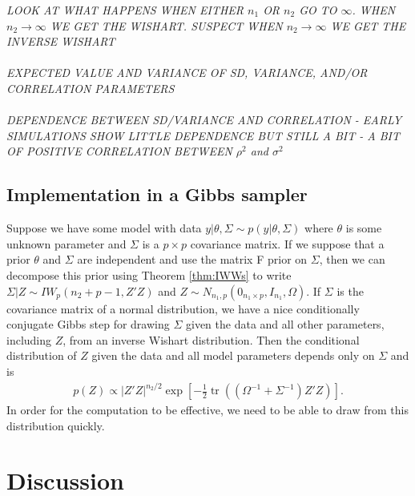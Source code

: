 \documentclass{article}\usepackage[]{graphicx}\usepackage[]{color}
\DeclareMathOperator{\tr}{tr}
\begin{document}
{\it LOOK AT WHAT HAPPENS WHEN EITHER $n_1$ OR $n_2$ GO TO $\infty$. WHEN $n_2\to\infty$ WE GET THE WISHART. SUSPECT WHEN $n_2\to\infty$ WE GET THE INVERSE WISHART}\\~\\

{\it EXPECTED VALUE AND VARIANCE OF 
  SD, VARIANCE, AND/OR CORRELATION PARAMETERS}\\~\\


{\it DEPENDENCE BETWEEN SD/VARIANCE AND CORRELATION - EARLY SIMULATIONS SHOW LITTLE DEPENDENCE BUT STILL A BIT - A BIT OF POSITIVE CORRELATION BETWEEN $\rho^2$ and $\sigma^2$}

\subsection{Implementation in a Gibbs sampler}

Suppose we have some model with data $y|\theta,\Sigma\sim p(y|\theta,\Sigma)$ where $\theta$ is some unknown parameter and $\Sigma$ is a $p\times p$ covariance matrix. If we suppose that a prior $\theta$ and $\Sigma$ are independent and use the matrix F prior on $\Sigma$, then we can decompose this prior using Theorem \eqref{thm:IWWs} to write $\Sigma|Z \sim IW_p(n_2 + p - 1, Z'Z)$ and $Z\sim N_{n_1,p}(0_{n_1\times p},I_{n_1},\Omega)$. If $\Sigma$ is the covariance matrix of a normal distribution, we have a nice conditionally conjugate Gibbs step for drawing $\Sigma$ given the data and all other parameters, including $Z$, from an inverse Wishart distribution. Then the conditional distribution of $Z$ given the data and all model parameters depends only on $\Sigma$ and is
\begin{align*}
  p(Z) \propto |Z'Z|^{n_2/2} \exp\left[-\frac{1}{2}\tr\left((\Omega^{-1} + \Sigma^{-1})Z'Z\right)\right].
\end{align*}
In order for the computation to be effective, we need to be able to draw from this distribution quickly.

\section{Discussion}
\end{document}
